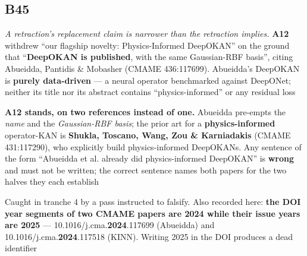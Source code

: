\documentclass[10pt]{article}
\begin{document}
\subsection*{B45}\label{led:B45}
\begin{description}[leftmargin=0pt,itemsep=1pt]
\item[Defect.] \emph{A retraction's replacement claim is narrower than the retraction implies.} \textbf{A12} withdrew ``our flagship novelty: Physics-Informed DeepOKAN'' on the ground that ``\textbf{DeepOKAN is published}, with the same Gaussian-RBF basis'', citing Abueidda, Pantidis \& Mobasher (CMAME 436:117699). Abueidda's DeepOKAN is \textbf{purely data-driven} --- a neural operator benchmarked against DeepONet; neither its title nor its abstract contains ``physics-informed'' or any residual loss
\item[Resolution.] \textbf{A12 stands, on two references instead of one.} Abueidda pre-empts the \emph{name} and the \emph{Gaussian-RBF basis}; the prior art for a \textbf{physics-informed} operator-KAN is \textbf{Shukla, Toscano, Wang, Zou \& Karniadakis} (CMAME 431:117290), who explicitly build physics-informed DeepOKANs. Any sentence of the form ``Abueidda et al. already did physics-informed DeepOKAN'' is \textbf{wrong} and must not be written; the correct sentence names both papers for the two halves they each establish
\item[Note.] Caught in tranche 4 by a pass instructed to falsify. Also recorded here: \textbf{the DOI year segments of two CMAME papers are 2024 while their issue years are 2025} --- 10.1016/j.cma.\textbf{2024}.117699 (Abueidda) and 10.1016/j.cma.\textbf{2024}.117518 (KINN). Writing 2025 in the DOI produces a dead identifier
\end{description}
\end{document}
